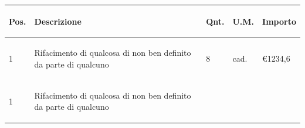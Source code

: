 \documentclass[a4paper]{article}
\begin{document}
  \noindent\begin{tabular}{ | L{10mm} |  L{86mm} | L{12mm} | L{12mm} | L{16mm} | }
  \hline
  \vspace{2.5mm}
  \begin{spacing}{0}
    \textbf{Pos.}
  \end{spacing} &
  \vspace{2.5mm}
  \begin{spacing}{0}
    \textbf{Descrizione}
  \end{spacing} &
  \vspace{2.5mm}
  \begin{spacing}{0}
    \textbf{Qnt.}
  \end{spacing} &
  \vspace{2.5mm}
  \begin{spacing}{0}
    \textbf{U.M.}
  \end{spacing} &
  \vspace{2.5mm}
  \begin{spacing}{0}
    \textbf{Importo}
  \end{spacing} \\
  \hline
  \vspace{2.5mm}
  \begin{spacing}{0}
    1
  \end{spacing} &
  \vspace{2.5mm}
  \begin{spacing}{0}
    Rifacimento di qualcosa di non ben definito da parte di qualcuno
  \end{spacing} &
  \vspace{2.5mm}
  \begin{spacing}{0}
    8
  \end{spacing} &
  \vspace{2.5mm}
  \begin{spacing}{0}
    cad.
  \end{spacing} &
  \vspace{2.5mm}
  \begin{spacing}{0}
    \euro\hfill 1234,6
  \end{spacing} \\
  \hline
  \vspace{2.5mm}
  \begin{spacing}{0}
    1
  \end{spacing} &
  \vspace{2.5mm}
  \begin{spacing}{0}
    Rifacimento di qualcosa di non ben definito da parte di qualcuno

\end{spacing}
\end{tabular}
\end{document}
